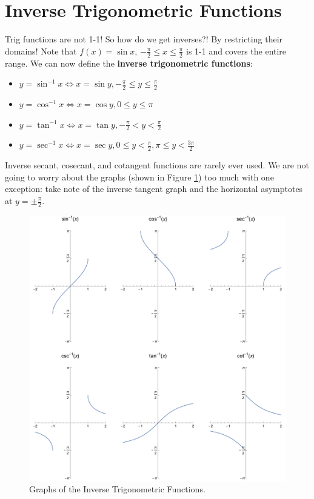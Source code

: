 \documentclass[letterpaper, 11pt, openany]{book}
\theoremstyle{mytheoremstyle}
\theoremstyle{myexamplestyle}
\begin{document}
\section{Inverse Trigonometric Functions}
\setcounter{figure}{0}
Trig functions are not 1-1! So how do we get inverses?! By restricting their domains! Note that $f(x) = \sin x$, $-\frac{\pi}{2} \leq x \leq \frac{\pi}{2}$ is 1-1 and covers the entire range. We can now define the \textbf{inverse trigonometric functions}:
\begin{itemize}
    \item $y = \sin^{-1} x \Leftrightarrow x = \sin y, -\frac{\pi}{2} \leq y \leq \frac{\pi}{2}$
    \item $y = \cos^{-1} x \Leftrightarrow x = \cos y, 0 \leq y \leq \pi$
    \item $y = \tan^{-1} x \Leftrightarrow x = \tan y, -\frac{\pi}{2} < y < \frac{\pi}{2}$
    \item $y = \sec^{-1} x \Leftrightarrow x = \sec y, 0 \leq y < \frac{\pi}{2}, \pi \leq y < \frac{3\pi}{2}$
\end{itemize}
Inverse secant, cosecant, and cotangent functions are rarely ever used. We are not going to worry about the graphs (shown in Figure \ref{f:invtrigfunctions}) too much with one exception: take note of the inverse tangent graph and the horizontal asymptotes at \(y = \pm \frac{\pi}{2}\).
\begin{figure}[htbp]
    \centering
        \includegraphics[width=\textwidth]{Figures/invtrigfunctions.pdf}
    \caption{Graphs of the Inverse Trigonometric Functions.}
    \label{f:invtrigfunctions}
\end{figure}
\end{document}
